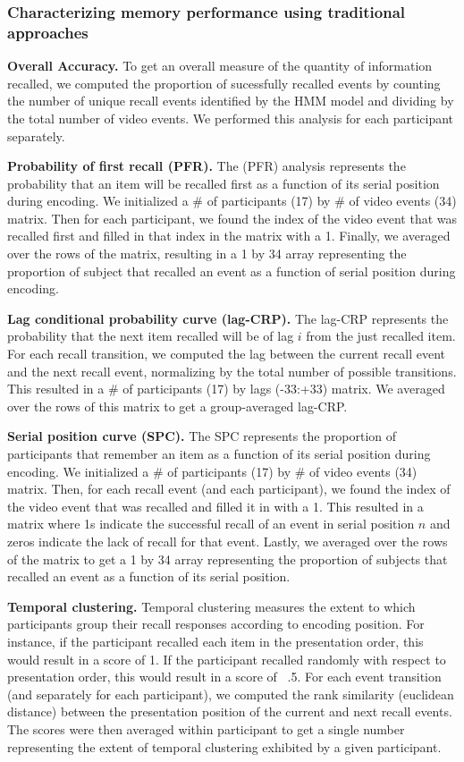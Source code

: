 \documentclass{article}
\begin{document}
{\subsubsection{Characterizing memory performance using traditional approaches}

\textbf{Overall Accuracy.}  To get an overall measure of the quantity of information recalled, we computed the proportion of sucessfully recalled events by counting the number of unique recall events identified by the HMM model and dividing by the total number of video events.  We performed this analysis for each participant separately.

\textbf{Probability of first recall (PFR).}  The (PFR) analysis represents the probability that an item will be recalled first as a function of its serial position during encoding. We initialized a \# of participants (17) by \# of video events (34) matrix. Then for each participant, we found the index of the video event that was recalled first and filled in that index in the matrix with a 1.  Finally, we averaged over the rows of the matrix, resulting in a 1 by 34 array representing the proportion of subject that recalled an event as a function of serial position during encoding.

\textbf{Lag conditional probability curve (lag-CRP).} The lag-CRP represents the probability that the next item recalled will be of lag $i$ from the just recalled item. For each recall transition, we computed the lag between the current recall event and the next recall event, normalizing by the total number of possible transitions.  This resulted in a \# of participants (17) by lags (-33:+33) matrix. We averaged over the rows of this matrix to get a group-averaged lag-CRP.

\textbf{Serial position curve (SPC).} The SPC represents the proportion of participants that remember an item as a function of its serial position during encoding. We initialized a \# of participants (17) by \# of video events (34) matrix. Then, for each recall event (and each participant), we found the index of the video event that was recalled and filled it in with a 1. This resulted in a matrix where 1s indicate the successful recall of an event in serial position $n$ and zeros indicate the lack of recall for that event.  Lastly, we averaged over the rows of the matrix to get a 1 by 34 array representing the proportion of subjects that recalled an event as a function of its serial position.

\textbf{Temporal clustering.} Temporal clustering measures the extent to which participants group their recall responses according to encoding position. For instance, if the participant recalled each item in the presentation order, this would result in a score of 1. If the participant recalled randomly with respect to presentation order, this would result in a score of ~.5.  For each event transition (and separately for each participant), we computed the rank similarity (euclidean distance) between the presentation position  of the current and next recall events. The scores were then averaged within participant to get a single number representing the extent of temporal clustering exhibited by a given participant.

}
\end{document}
